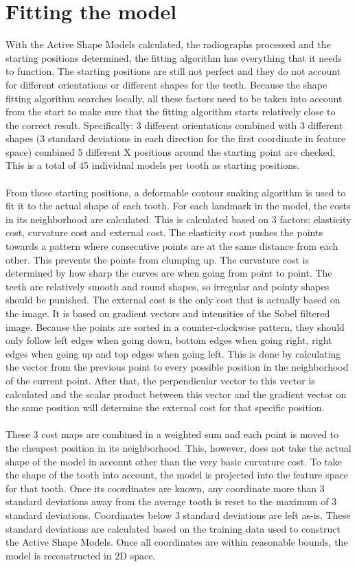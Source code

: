 \documentclass[a4paper,10pt]{article}
\begin{document}
\section{Fitting the model}
With the Active Shape Models calculated, the radiographs processed and the starting positions determined, the fitting algorithm has everything that it needs to function. The starting positions are still not perfect and they do not account for different orientations or different shapes for the teeth. Because the shape fitting algorithm searches locally, all these factors need to be taken into account from the start to make sure that the fitting algorithm starts relatively close to the correct result. Specifically: 3 different orientations combined with 3 different shapes (3 standard deviations in each direction for the first coordinate in feature space) combined 5 different X positions around the starting point are checked. This is a total of 45 individual models per tooth as starting positions.
\\\\
From these starting positions, a deformable contour snaking algorithm is used to fit it to the actual shape of each tooth. For each landmark in the model, the costs in its neighborhood are calculated. This is calculated based on 3 factors: elasticity cost, curvature cost and external cost. The elasticity cost pushes the points towards a pattern where consecutive points are at the same distance from each other. This prevents the points from clumping up. The curvature cost is determined by how sharp the curves are when going from point to point. The teeth are relatively smooth and round shapes, so irregular and pointy shapes should be punished. The external cost is the only cost that is actually based on the image. It is based on gradient vectors and intensities of the Sobel filtered image. Because the points are sorted in a counter-clockwise pattern, they should only follow left edges when going down, bottom edges when going right, right edges when going up and top edges when going left. This is done by calculating the vector from the previous point to every possible position in the neighborhood of the current point. After that, the perpendicular vector to this vector is calculated and the scalar product between this vector and the gradient vector on the same position will determine the external cost for that specific position.
\\\\
These 3 cost maps are combined in a weighted sum and each point is moved to the cheapest position in its neighborhood. This, however, does not take the actual shape of the model in account other than the very basic curvature cost. To take the shape of the tooth into account, the model is projected into the feature space for that tooth. Once its coordinates are known, any coordinate more than 3 standard deviations away from the average tooth is reset to the maximum of 3 standard deviations. Coordinates below 3 standard deviations are left as-is. These standard deviations are calculated based on the training data used to construct the Active Shape Models. Once all coordinates are within reasonable bounds, the model is reconstructed in 2D space.
\end{document}
